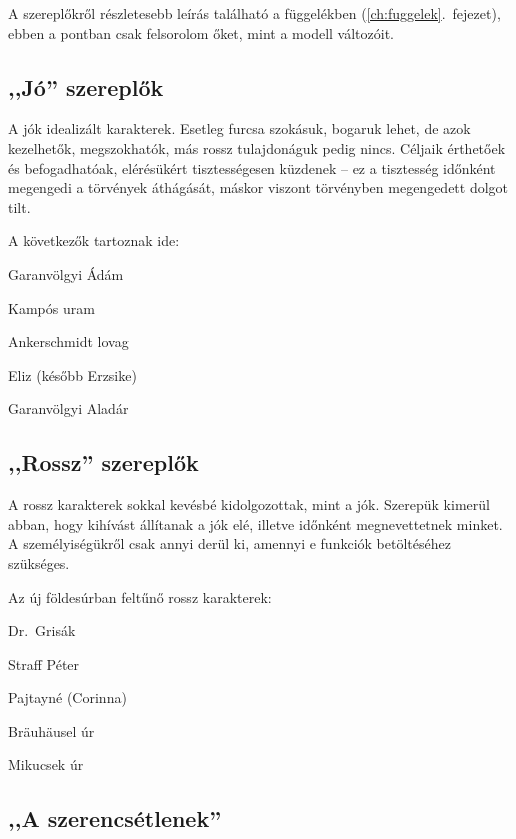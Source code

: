 \documentclass{thesis-ekf}
\theoremstyle{definition}
\begin{document}
    A szereplőkről részletesebb leírás található a függelékben (\ref{ch:fuggelek}.~fejezet),
        ebben a pontban csak felsorolom őket, mint a modell változóit.

    \subsection{,,Jó'' szereplők}

    A jók idealizált karakterek.
    Esetleg furcsa szokásuk, bogaruk lehet, de azok kezelhetők, megszokhatók, más rossz tulajdonáguk pedig nincs.
    Céljaik érthetőek és befogadhatóak, elérésükért tisztességesen küzdenek -- ez a tisztesség időnként megengedi
        a törvények áthágását, máskor viszont törvényben megengedett dolgot tilt.

    A következők tartoznak ide:

    \begin{compactitem}
        \item Garanvölgyi Ádám
        \item Kampós uram
        \item Ankerschmidt lovag
        \item Eliz (később Erzsike)
        \item Garanvölgyi Aladár
    \end{compactitem}

    \subsection{,,Rossz'' szereplők}

    A rossz karakterek sokkal kevésbé kidolgozottak, mint a jók.
    Szerepük kimerül abban, hogy kihívást állítanak a jók elé, illetve időnként megnevettetnek minket.
    A személyiségükről csak annyi derül ki, amennyi e funkciók betöltéséhez szükséges.

    Az új földesúrban feltűnő rossz karakterek:

    \begin{compactitem}
        \item Dr.~Grisák
        \item Straff Péter
        \item Pajtayné (Corinna)
        \item Bräuhäusel úr
        \item Mikucsek úr
    \end{compactitem}

    \subsection{,,A szerencsétlenek''}
\end{document}
